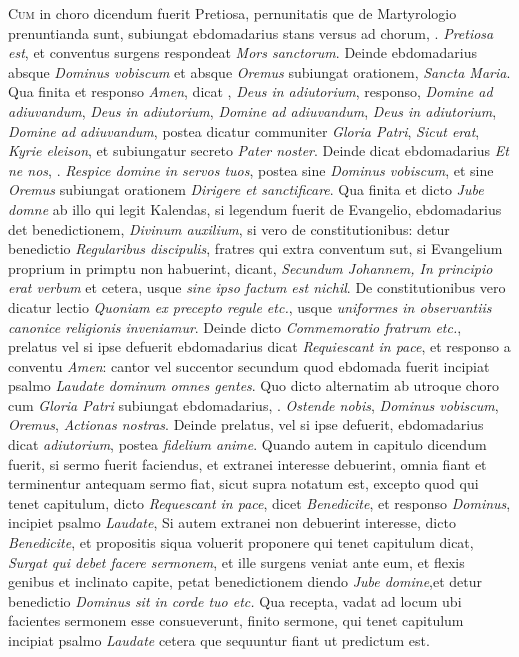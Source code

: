 \begin{multicols*}{2}
{\color{Red} }
\lettrine[lines=2]{\zallmancaps \color{Red} C}{um} in choro dicendum fuerit Pretiosa, pernunitatis que de Martyrologio prenuntianda sunt, subiungat ebdomadarius stans versus ad chorum, \Vbar . \textit{Pretiosa est}, et conventus surgens respondeat \textit{Mors sanctorum}. Deinde ebdomadarius absque \textit{Dominus vobiscum} et absque \textit{Oremus} subiungat orationem, \textit{Sancta Maria}. Qua finita et responso \textit{Amen}, dicat \Vbar , \textit{Deus in adiutorium}, responso, \textit{Domine ad adiuvandum}, \textit{Deus in adiutorium}, \textit{Domine ad adiuvandum}, \textit{Deus in adiutorium}, \textit{Domine ad adiuvandum}, postea dicatur communiter \textit{Gloria Patri}, \textit{Sicut erat}, \textit{Kyrie eleison}, et subiungatur secreto \textit{Pater noster}.
Deinde dicat ebdomadarius \textit{Et ne nos}, \Vbar . \textit{Respice domine in servos tuos}, postea sine \textit{Dominus vobiscum}, et sine \textit{Oremus} subiungat orationem \textit{Dirigere et sanctificare}.
Qua finita et dicto \textit{Jube domne} ab illo qui legit Kalendas, si legendum fuerit de Evangelio, ebdomadarius det benedictionem, \textit{Divinum auxilium}, si vero de constitutionibus: detur benedictio \textit{Regularibus discipulis}, fratres qui extra conventum sut, si Evangelium proprium in primptu non habuerint, dicant, \textit{Secundum Johannem, In principio erat verbum} et cetera, usque \textit{sine ipso factum est nichil}. De constitutionibus vero dicatur lectio \textit{Quoniam ex precepto regule etc.}, usque \textit{uniformes in observantiis canonice religionis inveniamur}. Deinde dicto \textit{Commemoratio fratrum etc.}, prelatus vel si ipse defuerit ebdomadarius dicat \textit{Requiescant in pace}, et responso a conventu \textit{Amen}: cantor vel succentor secundum quod ebdomada fuerit incipiat psalmo \textit{Laudate dominum omnes gentes}. Quo dicto alternatim ab utroque choro cum \textit{Gloria Patri} subiungat ebdomadarius, \Vbar . \textit{Ostende nobis}, \textit{Dominus vobiscum}, \textit{Oremus}, \textit{Actionas nostras}. Deinde prelatus, vel si ipse defuerit, ebdomadarius dicat \textit{adiutorium}, postea \textit{fidelium anime}.
Quando autem in capitulo dicendum fuerit, si sermo fuerit faciendus, et extranei interesse debuerint, omnia fiant et terminentur antequam sermo fiat, sicut supra notatum est, excepto quod qui tenet capitulum, dicto \textit{Requescant in pace}, dicet \textit{Benedicite}, et responso \textit{Dominus}, incipiet psalmo \textit{Laudate}, Si autem extranei non debuerint interesse, dicto \textit{Benedicite}, et propositis siqua voluerit proponere qui tenet capitulum dicat, \textit{Surgat qui debet facere sermonem}, et ille surgens veniat ante eum, et flexis genibus et inclinato capite, petat benedictionem diendo \textit{Jube domine},et detur benedictio \textit{Dominus sit in corde tuo etc.} Qua recepta, vadat ad locum ubi facientes sermonem esse consueverunt, finito sermone, qui tenet capitulum incipiat psalmo \textit{Laudate} cetera que sequuntur fiant ut predictum est.

\end{multicols*}
